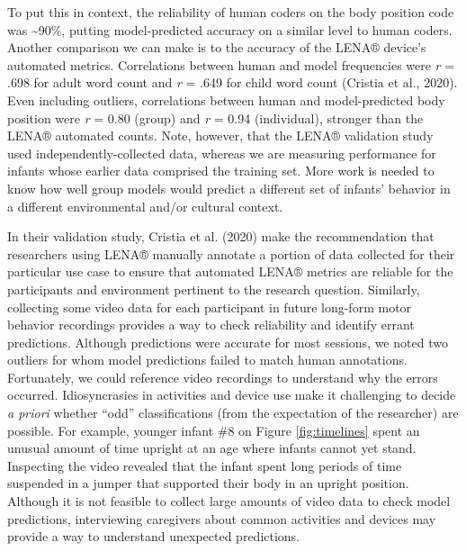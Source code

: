 \documentclass[
  man]{apa6}
\begin{document}
To put this in context, the reliability of human coders on the body position code was \textasciitilde90\%, putting model-predicted accuracy on a similar level to human coders. Another comparison we can make is to the accuracy of the LENA® device's automated metrics. Correlations between human and model frequencies were \emph{r} = .698 for adult word count and \emph{r} = .649 for child word count (Cristia et al., 2020). Even including outliers, correlations between human and model-predicted body position were \emph{r} = 0.80 (group) and \emph{r} = 0.94 (individual), stronger than the LENA® automated counts. Note, however, that the LENA® validation study used independently-collected data, whereas we are measuring performance for infants whose earlier data comprised the training set. More work is needed to know how well group models would predict a different set of infants' behavior in a different environmental and/or cultural context.

In their validation study, Cristia et al. (2020) make the recommendation that researchers using LENA® manually annotate a portion of data collected for their particular use case to ensure that automated LENA® metrics are reliable for the participants and environment pertinent to the research question. Similarly, collecting some video data for each participant in future long-form motor behavior recordings provides a way to check reliability and identify errant predictions. Although predictions were accurate for most sessions, we noted two outliers for whom model predictions failed to match human annotations. Fortunately, we could reference video recordings to understand why the errors occurred. Idiosyncrasies in activities and device use make it challenging to decide \emph{a priori} whether ``odd'' classifications (from the expectation of the researcher) are possible. For example, younger infant \#8 on Figure \ref{fig:timelines} spent an unusual amount of time upright at an age where infants cannot yet stand. Inspecting the video revealed that the infant spent long periods of time suspended in a jumper that supported their body in an upright position. Although it is not feasible to collect large amounts of video data to check model predictions, interviewing caregivers about common activities and devices may provide a way to understand unexpected predictions.
\end{document}

